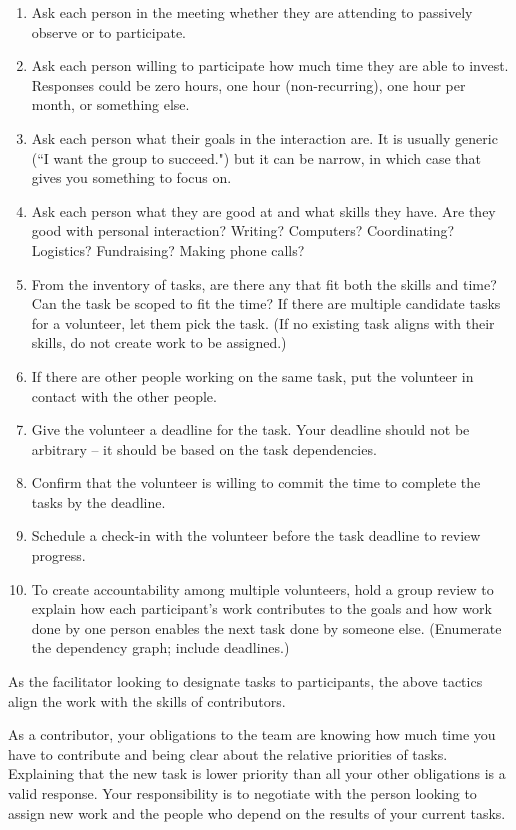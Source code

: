 \begin{enumerate}
    \item Ask each person in the meeting whether they are attending to passively observe or to participate.
    \item Ask each person willing to participate how much time they are able to invest. Responses could be zero hours, one hour (non-recurring), one hour per month, or something else.
    \item Ask each person what their goals in the interaction are. It is usually generic (``I want the group to succeed.") but it can be narrow, in which case that gives you something to focus on.
    \item Ask each person what they are good at and what skills they have. Are they good with personal interaction? Writing? Computers? Coordinating? Logistics? Fundraising? Making phone calls?
    \item From the inventory of tasks, are there any that fit both the skills and time? Can the task be scoped to fit the time? If there are multiple candidate tasks for a volunteer, let them pick the task. (If no existing task aligns with their skills, do not create work to be assigned.)
    \item If there are other people working on the same task, put the volunteer in contact with the other people.
    \item Give the volunteer a deadline for the task. Your deadline should not be arbitrary -- it should be based on the task dependencies. 
    \item Confirm that the volunteer is willing to commit the time to complete the tasks by the deadline.
    \item Schedule a check-in with the volunteer before the task deadline to review progress.
    \item To create accountability among multiple volunteers, hold a group review to explain how each participant's work contributes to the goals and how work done by one person enables the next task done by someone else. (Enumerate the dependency graph; include deadlines.)
\end{enumerate}

As the facilitator looking to designate tasks to participants, the above tactics align the work with the skills of contributors. 

As a contributor, your obligations to the team are knowing how much time you have to contribute and being clear about the relative priorities of tasks. Explaining that the new task is lower priority than all your other obligations is a valid response. Your responsibility is to negotiate with the person looking to assign new work and the people who depend on the results of your current tasks. 